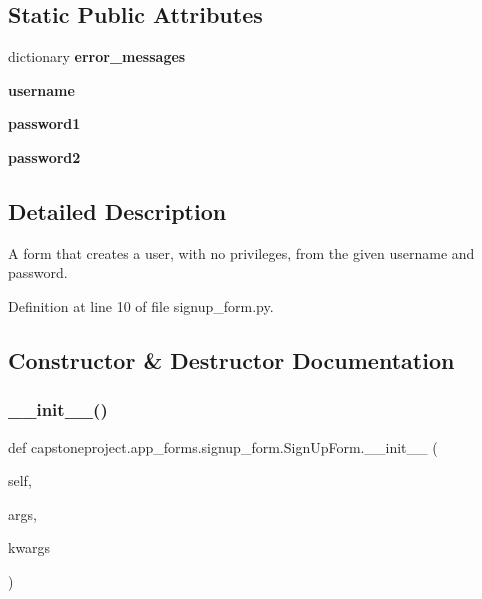 \subsection*{Static Public Attributes}
\begin{DoxyCompactItemize}
\item 
dictionary {\bfseries error\+\_\+messages}
\item 
{\bfseries username}
\item 
{\bfseries password1}
\item 
{\bfseries password2}
\end{DoxyCompactItemize}


\subsection{Detailed Description}
\begin{DoxyVerb}    A form that creates a user, with no privileges, from the given username and
    password.
\end{DoxyVerb}
 

Definition at line 10 of file signup\+\_\+form.\+py.



\subsection{Constructor \& Destructor Documentation}
\mbox{\label{classcapstoneproject_1_1app__forms_1_1signup__form_1_1_sign_up_form_af4a56ce83a41432e702f9ad60f0254a5}} 
\subsubsection{\texorpdfstring{\+\_\+\+\_\+init\+\_\+\+\_\+()}{\_\_init\_\_()}}
{\footnotesize\ttfamily def capstoneproject.\+app\+\_\+forms.\+signup\+\_\+form.\+Sign\+Up\+Form.\+\_\+\+\_\+init\+\_\+\+\_\+ (\begin{DoxyParamCaption}\item[{}]{self,  }\item[{}]{args,  }\item[{}]{kwargs }\end{DoxyParamCaption})}

